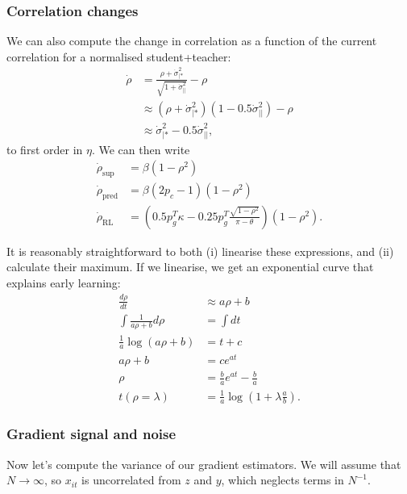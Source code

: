 \documentclass{article}
\begin{document}
\subsubsection*{Correlation changes}

We can also compute the change in correlation as a function of the current correlation for a normalised student+teacher:
\begin{align}
    \dot{\rho} &= \frac{\rho + \dot{\sigma}^2_{|*}}{\sqrt{1+ \dot{\sigma}^2_{||}}} - \rho\\
    &\approx (\rho + \dot{\sigma}^2_{|*})(1-0.5 \dot{\sigma}^2_{||}) - \rho\\
    &\approx \dot{\sigma}^2_{|*} - 0.5 \dot{\sigma}^2_{||},
\end{align}
to first order in $\eta$.
We can then write
\begin{align}
    \dot{\rho}_\text{sup} &= \beta ( 1 - \rho^2  )\\
    \dot{\rho}_\text{pred} &= \beta (2p_c-1)(1  - \rho^2)\\
    \dot{\rho}_\text{RL} &= \left ( 0.5 p_g^T \kappa - 0.25 p_g^T \frac{\sqrt{1-\rho^2}}{\pi- \theta} \right ) (1 - \rho^2 ).
\end{align}

It is reasonably straightforward to both (i) linearise these expressions, and (ii) calculate their maximum.
If we linearise, we get an exponential curve that explains early learning:
\begin{align}
    \frac{d \rho}{d t} &\approx a \rho + b\\
    \int \frac{1}{a \rho + b} d\rho &= \int dt \\
    \frac{1}{a} \log (a \rho + b) &= t + c\\
    a \rho + b &= c e^{a t} \\
    \rho &= \frac{b}{a} e^{at} - \frac{b}{a}\\
    t(\rho = \lambda) &= \frac{1}{a} \log \left ( 1 + \lambda \frac{a}{b} \right ).
\end{align}


\subsubsection*{Gradient signal and noise}

Now let's compute the variance of our gradient estimators.
We will assume that $N \rightarrow \infty$, so $x_{it}$ is uncorrelated from $z$ and $y$, which neglects terms in $N^{-1}$.
\end{document}
